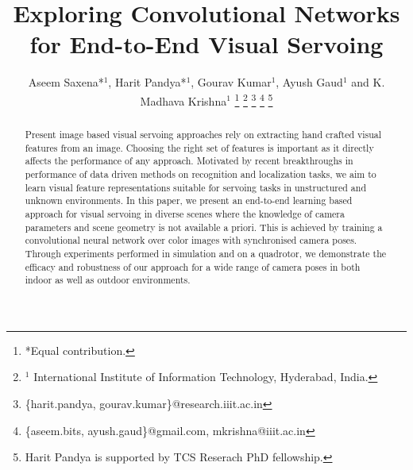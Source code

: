 \documentclass[usletter, 10 pt, conference]{ieeeconf}  %
\title{\LARGE \bf
Exploring Convolutional Networks for End-to-End Visual Servoing
}
\author{Aseem Saxena*$^1$, Harit Pandya*$^1$, Gourav Kumar$^1$, Ayush Gaud$^1$ and K. Madhava Krishna$^1$ 
\thanks{*Equal contribution.}
\thanks{$^1$ International Institute of Information Technology, Hyderabad, India.}
\thanks{\{harit.pandya, gourav.kumar\}@research.iiit.ac.in}
\thanks{\{aseem.bits, ayush.gaud\}@gmail.com, mkrishna@iiit.ac.in}
\thanks{Harit Pandya is supported by TCS Reserach PhD fellowship.}
}%
\begin{document}
\maketitle
\thispagestyle{empty}
\pagestyle{empty}


\begin{abstract}
 Present image based visual servoing approaches rely on extracting hand crafted visual features from an image. Choosing the right set of features is important as it directly affects the performance of any approach. Motivated by recent breakthroughs in performance of data driven methods on recognition and localization tasks, we aim to learn visual feature representations suitable for servoing tasks in unstructured and unknown environments. In this paper, we present an end-to-end learning based approach for visual servoing in diverse scenes where the knowledge of camera parameters and scene geometry is not available a priori. This is achieved by training a convolutional neural network over color images with synchronised camera poses. Through experiments performed in simulation and on a quadrotor, we demonstrate the efficacy and robustness of our approach for a wide range of camera poses in both indoor as well as outdoor environments. %
\end{abstract}
\end{document}
